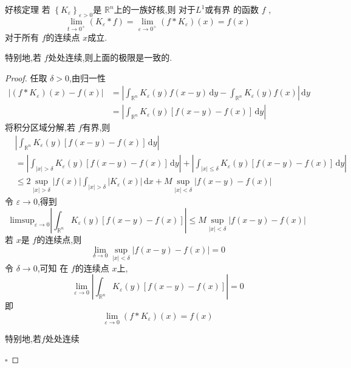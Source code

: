 \documentclass[../../main.tex]{subfiles}
\begin{document}
\begin{theorem}{好核定理}
    若 \(  \left\{  K_{ \varepsilon }\right\}_{ \varepsilon > 0}  \)是 \(  \mathbb{R} ^{n}  \)上的一族好核,则  对于\(  L^{1}  \)或有界 的函数 \(  f  \) ,  \[\lim_{t \to 0^{+ }}\left( K_{ \varepsilon }*f \right)=  
    \lim_{ \varepsilon \to 0^{+ }}\left( f*K_{ \varepsilon } \right)\left( x \right)= f\left( x \right)   
    \]对于所有  \(  f  \)的连续点 \(  x  \)成立.
    
    特别地,若 \(  f  \)处处连续,则上面的极限是一致的. 
\end{theorem}
\begin{proof}
   任取 \(   \delta > 0  \),由归一性 \[
    \begin{aligned}
    \left| \left( f* K_{ \varepsilon }\right)\left( x \right)-f\left( x \right)    \right|&= \left| \int_{\mathbb{R} ^{n}}K_{ \varepsilon }\left(y\right) f\left(x- y \right)\,\mathrm{d} y- \int_{\mathbb{R} ^{n}} K_{ \varepsilon }\left( y \right)f\left( x \right)     \right|  \,\mathrm{d} y \\ 
     &=  \left| \int_{\mathbb{R} ^{n}}K_{ \varepsilon }\left( y \right)\left[ f\left( x-y \right)-f\left( x \right)   \right] \,\mathrm{d} y  \right| 
    \end{aligned}
    \]将积分区域分解,若 \(  f  \)有界,则   \[
    \begin{aligned}
   & \left| \int_{\mathbb{R} ^{n}}K_{ \varepsilon }\left( y \right)\left[ f\left( x-y \right)-f\left( x \right)   \right]\,\mathrm{d} y \right|   \\ 
    &= \left| \int_{\left| x \right|>  \delta  }K_{ \varepsilon }\left( y \right)\left[ f\left( x-y \right)-f\left( x \right)   \right]\,\mathrm{d} y  \right| +\left|  \int_{\left| x \right|\le  \delta  }K_{ \varepsilon }\left( y \right)\left[ f\left( x-y \right)-f\left( x \right)   \right]\,\mathrm{d} y  \right| \\ 
     &\le 2\sup _{\left| x \right|>  \delta  }\left| f\left( x \right)  \right| \int_{\left| x \right|>  \delta  }\left| K_{ \varepsilon }\left( x \right)  \right|\,\mathrm{d} x+ M \sup _{\left| x \right|<  \delta  }\left| f\left( x-y \right)-f\left( x \right)   \right|   
    \end{aligned} 
    \]
    令 \(   \varepsilon \to 0  \),得到 \[
    \mathrm{limsup}_{ \varepsilon \to 0} \left| \int_{\mathbb{R} ^{n}}K_{ \varepsilon }\left( y \right)\left[ f\left( x-y \right)-f\left( x \right)   \right]   \right|\le M\sup _{\left| x \right|<  \delta  }\left| f\left( x-y \right)-f\left( x \right)   \right|  
    \] 若 \(  x  \)是 \(  f  \)的连续点,则 \[
    \lim_{ \delta \to 0} \sup _{\left| x \right|<  \delta  }\left| f\left( x-y \right)-f\left( x \right)   \right|= 0 
    \]  令 \(   \delta \to 0  \),可知 在 \(  f  \)的连续点 \(  x  \)上,   \[
    \lim_{ \varepsilon \to 0} \left| \int_{\mathbb{R} ^{n}}K_{ \varepsilon }\left( y \right)\left[ f\left( x-y \right)-f\left( x \right)   \right]   \right|= 0 
    \]即 \[
    \lim_{ \varepsilon \to 0}\left( f*K_{ \varepsilon } \right)\left( x \right)= f\left( x \right)   
    \]

    特别地,若\(  f  \)处处连续

  
    \hfill $\square$
\end{proof}
\end{document}
